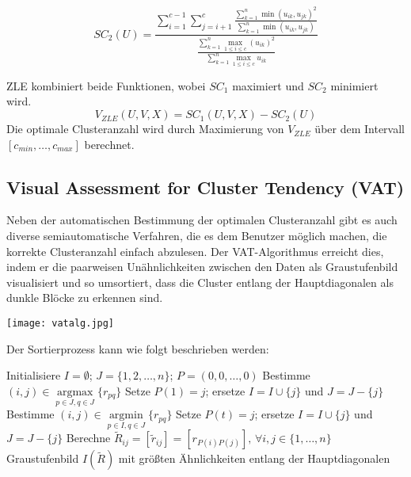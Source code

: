 \documentclass[11pt,ceqn]{book}
\DeclareMathOperator*{\argmax}{argmax}
\DeclareMathOperator*{\argmin}{argmin}
\begin{document}
$$SC_2(U) = \frac{\sum\limits_{i=1}^{c-1} \sum\limits_{j=i+1}^c\frac{\sum\limits_{k=1}^n \min(u_{ik},u_{jk})^2}{\sum\limits_{k=1}^n \min(u_{ik},u_{jk})}}{\frac{\sum\limits_{k=1}^n \max_{1\leqslant i \leqslant c}(u_{ik})^2}{\sum\limits_{k=1}^n \max_{1\leqslant i \leqslant c}u_{ik}}}$$ 

ZLE kombiniert beide Funktionen, wobei $SC_1$ maximiert und $SC_2$ minimiert wird.
$$V_{ZLE}(U,V,X) = SC_1(U,V,X)-SC_2(U)$$
Die optimale Clusteranzahl wird durch Maximierung von
$V_{ZLE}$ über dem Intervall $\left[c_{min},\dots,c_{max}\right]$ berechnet.
\subsection{Visual Assessment for Cluster Tendency (VAT)}
\begin{minipage}{0.35\textwidth}\raggedright
Neben der automatischen Bestimmung der optimalen Clusteranzahl gibt es auch diverse semiautomatische Verfahren, die es dem Benutzer möglich machen, die korrekte Clusteranzahl einfach abzulesen. Der VAT-Algorithmus erreicht dies, indem er die paarweisen Unähnlichkeiten zwischen den Daten als Graustufenbild visualisiert und so umsortiert, dass die Cluster entlang der Hauptdiagonalen als dunkle Blöcke zu erkennen sind.
\end{minipage}
\hfill
\begin{minipage}{0.6\textwidth}
\texttt{[image: vatalg.jpg]}
\end{minipage}
 
\vspace{\belowdisplayskip}

Der Sortierprozess kann wie folgt beschrieben werden:
\begin{algorithm}[H]
\caption{$VAT(R)$}\label{vatalg}
\begin{algorithmic}[1]
\State Initialisiere $I=\emptyset$; $J=\{1,2,\dots,n\}$; $P = (0,0,\dots,0)$
\State Bestimme $(i,j)\in \argmax\limits_{p\in J, q\in J}\{r_{pq}\}$
\State Setze $P(1)=j$; ersetze $I = I \cup \{j\}$ und $J = J - \{j\}$
\State Bestimme $(i,j) \in \argmin\limits_{p\in I, q\in J}\{r_{pq}\}$
\State Setze $P(t) = j$; ersetze $I = I \cup \{j\}$ und $J = J - \{j\}$
\EndFor
\State Berechne $\tilde{R}_{ij} = \left[\tilde{r}_{ij}\right] = \left[r_{P(i)P(j)}\right],\, \forall i,j \in \{1,\dots,n\}$
\State \Return Graustufenbild $I(\tilde{R})$ mit größten Ähnlichkeiten entlang der Hauptdiagonalen
\end{algorithmic}
\end{algorithm}
\end{document}
